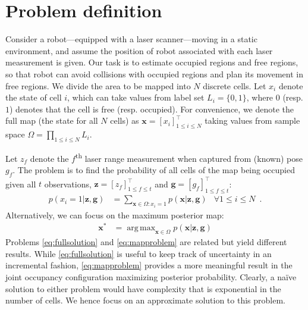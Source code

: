 \documentclass[letterpaper, 10 pt, conference]{ieeeconf} %
\DeclareMathOperator*{\argmax}{arg\,max}
\newcommand{\vect}[1]{\mathbf{#1}}
\begin{document}
\section{Problem definition}
\newcommand{\map}{\vect{x}}
\newcommand{\meas}{z}
\newcommand{\measurements}{\vect{\meas}}
\newcommand{\pose}{g}
\newcommand{\poses}{\vect{\pose}}
\newcommand{\unaryminus}{\scalebox{0.5}[0.5]{\( - \)}}
\newcommand{\prevtime}{1:t\unaryminus1}
\newcommand{\pastobs}{\measurements_{1:t\unaryminus1}, \poses_{1:t\unaryminus1}}
Consider a robot---equipped with a laser scanner---moving in a static
environment, and assume the position of robot associated with each laser
measurement is given. Our task is to estimate occupied regions and free
regions, so that robot can avoid collisions with occupied regions and plan its
movement in free regions.
We divide the area to be mapped into $N$ discrete cells. Let $x_i$ denote the
state of cell $i$, which can take values from label set $L_i = \{0, 1\}$, where
$0$ (resp. $1$) denotes that the cell is free (resp. occupied). 
For convenience, we denote the full map (the state for all $N$ cells) as $\map = [x_i]^\top_{1
\le i \le N}$ taking values from sample space $\Omega =
\prod_{1 \le i \le N}L_i$.


Let $\meas_f$ denote the $f$\textsuperscript{th} laser range measurement when 
captured from (known) pose $\pose_f$. 
The problem is to find the probability of all cells of the map being occupied
given all $t$ observations, $\measurements = [\meas_f]^\top_{1 \le f \le t}$ and
$\poses = [\pose_f]^\top_{1 \le f \le t}$:
%
\begin{align}
  p(x_i = 1 | \measurements, \poses) &= \sum_{\map \in \Omega : x_i = 1} p(\map 
  | \measurements , \poses) & \forall 1 \le i \le N \enspace. \label{eq:fullsolution}
\end{align}
%
Alternatively, we can focus on the maximum posterior map:
%
\begin{align}
  \map^* &= \argmax_{\map \in \Omega } p(\map | \measurements, \poses)
  \label{eq:mapproblem}
\end{align}
%
Problems \eqref{eq:fullsolution} and \eqref{eq:mapproblem} are related
but yield different results. While \eqref{eq:fullsolution} is
useful to keep track of uncertainty in an incremental fashion,
\eqref{eq:mapproblem} provides a more meaningful result in the joint
occupancy configuration maximizing posterior probability.
%
Clearly, a na\"{i}ve solution to either problem would have complexity that is 
exponential in the number of cells. We hence focus on an approximate solution to this problem.
\end{document}
